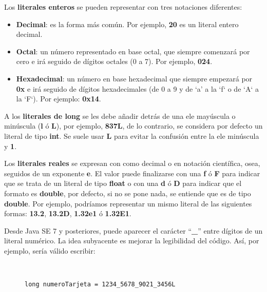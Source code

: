 Los \textbf{literales enteros} se pueden representar con tres notaciones diferentes:

\begin{itemize}
    \item \textbf{Decimal}: es la forma más común. Por ejemplo, \textbf{20} es un literal entero decimal.
    \item \textbf{Octal}: un número representado en base octal, que siempre comenzará por cero e irá seguido de dígitos octales (0 a 7). Por ejemplo, \textbf{024}.
    \item \textbf{Hexadecimal}: un número en base hexadecimal que siempre empezará por \textbf{0x} e irá seguido de dígitos hexadecimales (de 0 a 9 y de `a' a la `f` o de `A` a la `F`). Por ejemplo: \textbf{0x14}.
\end{itemize}

A los \textbf{literales de long} se les debe añadir detrás de una ele mayúscula o minúscula (\textbf{l} ó \textbf{L}), por ejemplo, \textbf{837L}, de lo contrario, se considera por defecto un literal de tipo \textbf{int}. Se suele usar \textbf{L} para evitar la confusión entre la ele minúscula y \textbf{1}.

Los \textbf{literales reales} se expresan con como decimal o en notación científica, osea, seguidos de un exponente \textbf{e}. El valor puede finalizarse con una \textbf{f} ó \textbf{F} para indicar que se trata de un literal de tipo \textbf{float} o con una \textbf{d} ó \textbf{D} para indicar que el formato es \textbf{double}, por defecto, si no se pone nada, se entiende que es de tipo \textbf{double}. Por ejemplo, podríamos representar un mismo literal de las siguientes formas: \textbf{13.2}, \textbf{13.2D}, \textbf{1.32e1} ó \textbf{1.32E1}.

Desde Java SE 7 y posteriores, puede aparecer el carácter ``\textbf{\_}'' entre dígitos de un literal numérico. La idea subyacente es mejorar la legibilidad del código. Así, por ejemplo, sería válido escribir:

\begin{figure}[H]
    \begin{tcolorbox}[sharp corners, colback=yellow!30, colframe=white!20]
        \scriptsize
        \begin{verbatim}


long numeroTarjeta = 1234_5678_9021_3456L
        \end{verbatim}
    \end{tcolorbox}
\end{figure}

